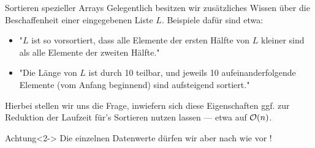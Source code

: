 \begin{frame}{Sortieren spezieller Arrays}
Gelegentlich besitzen wir zus\"atzliches Wissen \"uber die Beschaffenheit einer eingegebenen Liste $L$.
Beispiele daf\"ur sind etwa:
\begin{itemize}
    \item "$L$ ist so vorsortiert, dass alle Elemente der ersten Hälfte von $L$ kleiner sind als alle Elemente der zweiten Hälfte."
    \item "Die Länge von $L$ ist durch 10 teilbar, und jeweils 10 aufeinanderfolgende Elemente (vom Anfang beginnend) sind aufsteigend sortiert."
\end{itemize}
Hierbei stellen wir uns die Frage, inwiefern sich diese Eigenschaften ggf. zur Reduktion der Laufzeit f\"ur's Sortieren nutzen lassen --- etwa auf $\mathcal{O}(n)$.

\begin{alertblock}{Achtung}<2->
Die einzelnen Datenwerte d\"urfen wir aber nach wie vor !
\end{alertblock}
\end{frame}






